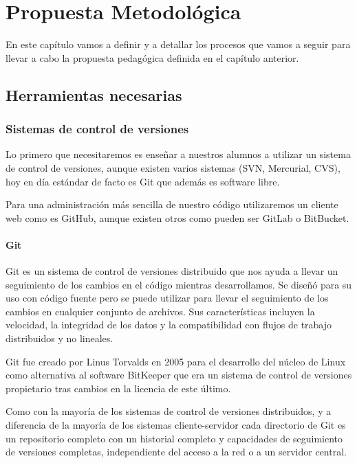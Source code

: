 \chapter{Propuesta Metodológica}

En este capítulo vamos a definir y a detallar los procesos que vamos a seguir para llevar a cabo la propuesta pedagógica definida en el capítulo anterior.

\section{Herramientas necesarias}

\subsection{Sistemas de control de versiones}

Lo primero que necesitaremos es enseñar a nuestros alumnos a utilizar un sistema de control de versiones, aunque existen varios sistemas (SVN, Mercurial, CVS), hoy en día estándar de facto es Git que además es software libre.

Para una administración más sencilla de nuestro código utilizaremos un cliente web como es GitHub, aunque existen otros como pueden ser GitLab o BitBucket.

\subsubsection {Git}

Git es un sistema de control de versiones distribuido que nos ayuda a llevar un seguimiento de los cambios en el código mientras desarrollamos. Se diseñó para su uso con código fuente pero se puede utilizar para llevar el seguimiento de los cambios en cualquier conjunto de archivos. Sus características incluyen la velocidad, la integridad de los datos y la compatibilidad con flujos de trabajo distribuidos y no lineales.

Git fue creado por Linus Torvalds en 2005 para el desarrollo del núcleo de Linux como alternativa al software BitKeeper que era un sistema de control de versiones propietario tras cambios en la licencia de este último.

Como con la mayoría de los sistemas de control de versiones distribuidos, y a diferencia de la mayoría de los sistemas cliente-servidor cada directorio de Git es un repositorio completo con un historial completo y capacidades de seguimiento de versiones completas, independiente del acceso a la red o a un servidor central.

